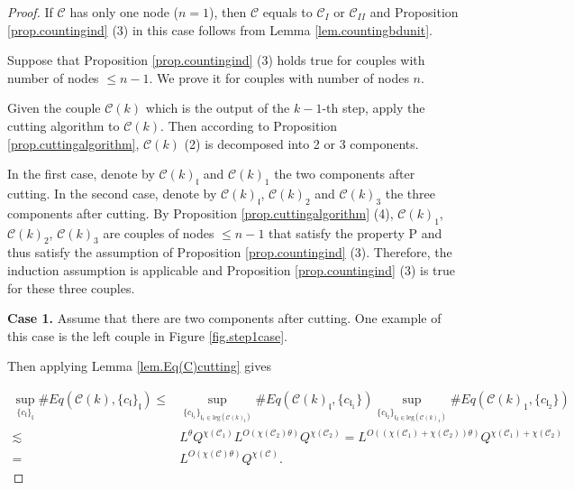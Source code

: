 \begin{proof}
If $\mathcal{C}$ has only one node ($n=1$), then $\mathcal{C}$ equals to $\mathcal{C}_{I}$ or $\mathcal{C}_{II}$ and Proposition \ref{prop.countingind} (3) in this case follows from Lemma \ref{lem.countingbdunit}.

Suppose that Proposition \ref{prop.countingind} (3) holds true for couples with number of nodes $\le n-1$. We prove it for couples with number of nodes $n$. 

Given the couple $\mathcal{C}(k)$ which is the output of the $k-1$-th step, apply the cutting algorithm to $\mathcal{C}(k)$. Then according to Proposition \ref{prop.cuttingalgorithm}, $\mathcal{C}(k)$ (2) is decomposed into 2 or 3 components.

In the first case, denote by $\mathcal{C}(k)_{
\mathfrak{l}}$ and $\mathcal{C}(k)_1$ the two components after cutting. In the second case, denote by $\mathcal{C}(k)_{
\mathfrak{l}}$, $\mathcal{C}(k)_2$ and $\mathcal{C}(k)_3$ the three components after cutting. By Proposition \ref{prop.cuttingalgorithm} (4), $\mathcal{C}(k)_1$, $\mathcal{C}(k)_2$, $\mathcal{C}(k)_3$ are couples of nodes $\le n-1$ that satisfy the property P and thus satisfy the assumption of Proposition \ref{prop.countingind} (3). Therefore, the induction assumption is applicable and Proposition \ref{prop.countingind} (3) is true for these three couples.

\textbf{Case 1.} Assume that there are two components after cutting. One example of this case is the left couple in Figure \ref{fig.step1case}.
    
Then applying Lemma \ref{lem.Eq(C)cutting} gives

\begin{equation}
\begin{split}
    \sup_{\{c_{\mathfrak{l}}\}_{\mathfrak{l}}}\#Eq(\mathcal{C}(k),\{c_{\mathfrak{l}}\}_{\mathfrak{l}})\le&
    \sup_{\{c_{\mathfrak{l}_1}\}_{\mathfrak{l}_1\in \text{leg}(\mathcal{C}(k)_{
\mathfrak{l}})} } \# Eq(\mathcal{C}(k)_{
\mathfrak{l}},\{c_{\mathfrak{l}_1}\}) \sup_{\{c_{\mathfrak{l}_2}\}_{\mathfrak{l}_2\in \text{leg}(\mathcal{C}(k)_1)} }\# Eq(\mathcal{C}(k)_1, \{c_{\mathfrak{l}_2}\})
    \\
    \lesssim&  L^{\theta} Q^{\chi(\mathcal{C}_1)} L^{O(\chi(\mathcal{C}_2)\theta)} Q^{\chi(\mathcal{C}_2)} = L^{O((\chi(\mathcal{C}_1)+\chi(\mathcal{C}_2))\theta)} Q^{\chi(\mathcal{C}_1)+\chi(\mathcal{C}_2)} \\
    =& L^{O(\chi(\mathcal{C})\theta)} Q^{\chi(\mathcal{C})}.
\end{split}
\end{equation}


\end{proof}
